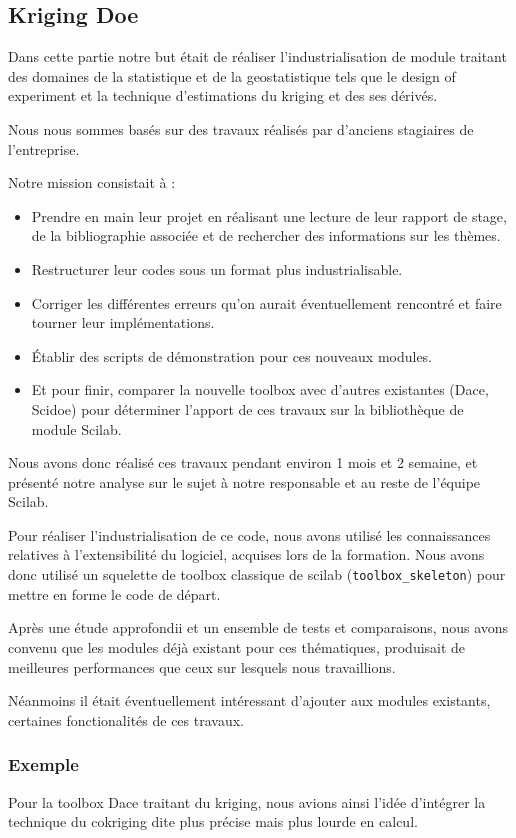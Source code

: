 \subsection*{Kriging Doe}

Dans cette partie notre but était de réaliser l’industrialisation
de module traitant des domaines de la statistique et de la
geostatistique tels que le design of experiment et la technique
d’estimations du kriging et des ses dérivés.

Nous nous sommes bas\'es sur des travaux réalisés par d’anciens
stagiaires de l’entreprise.

Notre mission consistait à :

\begin{itemize}
    \item Prendre en main leur projet en réalisant une lecture
        de leur rapport de stage, de la bibliographie associée
        et de rechercher des informations sur les thèmes.
    \item Restructurer leur codes sous un format plus industrialisable.
    \item Corriger les différentes erreurs qu’on aurait
        éventuellement rencontré et faire tourner leur implémentations.
    \item Établir des scripts de démonstration pour ces nouveaux modules.
    \item Et pour finir, comparer la nouvelle toolbox avec d’autres
        existantes (Dace, Scidoe) pour déterminer l’apport de ces
        travaux sur la bibliothèque de module Scilab.
\end{itemize}

Nous avons donc réalisé ces travaux pendant environ 1 mois et 2 semaine,
et présent\'e notre analyse sur le sujet à notre responsable
et au reste de l’équipe Scilab.

Pour réaliser l’industrialisation de ce code,
nous avons utilisé les connaissances relatives à
l’extensibilité du logiciel, acquises lors de la formation.
Nous avons donc utilisé un squelette de toolbox classique
de scilab ({\tt toolbox\_skeleton}) pour mettre en forme
le code de départ.

Après une étude approfondii et un ensemble de tests et comparaisons,
nous avons convenu que les modules déjà existant pour ces thématiques,
produisait de meilleures performances que ceux sur lesquels nous travaillions.

Néanmoins il était éventuellement intéressant d’ajouter aux modules existants,
certaines fonctionalités de ces travaux.

\subsubsection*{Exemple}
Pour la toolbox Dace traitant du kriging, nous avions ainsi l’idée d'intégrer
la technique du cokriging dite plus précise mais plus lourde en calcul.

